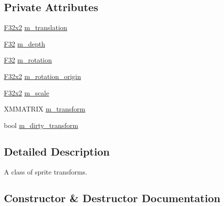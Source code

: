 \subsection*{Private Attributes}
\begin{DoxyCompactItemize}
\item 
\hyperlink{namespacemage_aa87237ad091f5cd7da612b8523fc108f}{F32x2} \hyperlink{classmage_1_1_sprite_transform_a4006065eb65336fceffa36a5c2c45e59}{m\+\_\+translation}
\item 
\hyperlink{namespacemage_aa97e833b45f06d60a0a9c4fc22ae02c0}{F32} \hyperlink{classmage_1_1_sprite_transform_a646e129b2e9702eec23b4c673f07dfef}{m\+\_\+depth}
\item 
\hyperlink{namespacemage_aa97e833b45f06d60a0a9c4fc22ae02c0}{F32} \hyperlink{classmage_1_1_sprite_transform_a7c705543e7f6a9c7e7a517ffef2cb4b9}{m\+\_\+rotation}
\item 
\hyperlink{namespacemage_aa87237ad091f5cd7da612b8523fc108f}{F32x2} \hyperlink{classmage_1_1_sprite_transform_aa6a3a2653a00fb17116ce81979214e27}{m\+\_\+rotation\+\_\+origin}
\item 
\hyperlink{namespacemage_aa87237ad091f5cd7da612b8523fc108f}{F32x2} \hyperlink{classmage_1_1_sprite_transform_a2995048f52d8d90d003ea421d58772be}{m\+\_\+scale}
\item 
X\+M\+M\+A\+T\+R\+IX \hyperlink{classmage_1_1_sprite_transform_ad2fec50a82772514da9399ff31703f3d}{m\+\_\+transform}
\item 
bool \hyperlink{classmage_1_1_sprite_transform_a3072ed606f16d14d16cdad46438e9cf3}{m\+\_\+dirty\+\_\+transform}
\end{DoxyCompactItemize}


\subsection{Detailed Description}
A class of sprite transforms. 

\subsection{Constructor \& Destructor Documentation}
\hypertarget{classmage_1_1_sprite_transform_a8d3760699d035e6315218bb6b589a2cb}{}\label{classmage_1_1_sprite_transform_a8d3760699d035e6315218bb6b589a2cb} 
